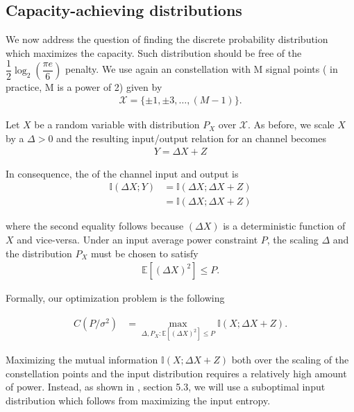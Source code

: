 \subsection{Capacity-achieving distributions}
We now address the question of finding the discrete probability distribution which maximizes the capacity. Such distribution should be free of the $ \dfrac{1}{2} \log_{2} \left(\dfrac{\pi e}{6}\right)$ penalty. We use again an  constellation with M signal points ( in practice, M is a power of 2) given by 
\begin{align}
	\mathcal{X} = \{\pm 1, \pm 3,\dots, (M-1)\}.
\end{align}

Let $X$ be a random variable with distribution $P_X$ over $\mathcal{X}$. As before, we scale $X$ by a $\Delta > 0$ and the resulting input/output relation for an  channel becomes
\begin{align}
	Y = \Delta X + Z
\end{align}

In consequence, the  of the channel input and output is 
\begin{align}
	\mathbb{I}(\Delta X; Y) &= \mathbb{I}(\Delta X; \Delta X + Z)\\
	&= \mathbb{I}(\Delta X; \Delta X + Z)
\end{align}

where the second equality follows because $(\Delta X)$ is a deterministic function of $X$ and vice-versa. Under an input average power constraint $P$, the scaling $\Delta$ and the distribution $P_X$ must be chosen to satisfy
\begin{align}
	\mathbb{E}[(\Delta X)^2] \leq P.
\end{align}

Formally, our optimization problem is the following

\begin{align}
	C(P/\sigma^2) &= \max\limits_{\Delta, P_X :\mathbb{E}[(\Delta X)^2] \leq P} \mathbb{I}(X;\Delta X+Z).
\end{align}

Maximizing the mutual information $\mathbb{I}(X;\Delta X+Z)$ both over the scaling of the constellation points and the input distribution requires a relatively high amount of power. Instead, as shown in \cite{Boecherer_CM}, section 5.3, we will use a suboptimal input distribution which follows from maximizing the input entropy.

